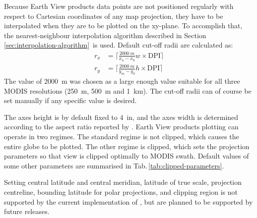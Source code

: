 Because Earth View products data points are not positioned regularly with
respect to Cartesian coordinates of any map projection, they have to be
interpolated when they are to be plotted on the xy-plane. To accomplish that,
the nearest-neighbour interpolation algorithm described in
Section\,\ref{sec:interpolation-algorithm}\, is used. Default cut-off radii are
calculated as:
\begin{align}
r_x &= \bigg\lceil \frac{\SI{2000}{m}}{x_n - x_0} w \times \mathrm{DPI}
\bigg\rceil \nonumber\\
r_y &= \bigg\lceil \frac{\SI{2000}{m}}{y_m - y_0} h \times \mathrm{DPI}
\bigg\rceil \nonumber
\end{align}
The value of \SI{2000}{m} was chosen as a large enough value suitable for all three MODIS
resolutions (\SI{250}{m}, \SI{500}{m} and \SI{1}{km}). The cut-off radii can of
course be set manually if any specific value is desired.

The axes height is by default fixed to \SI{4}{in}, and the axes width is
determined according to the aspect ratio reported by .
Earth View products plotting can operate in two regimes. The standard regime is
not clipped, which causes the entire globe to be plotted. The other regime is
clipped, which sets the projection parameters so that view is clipped
optimally to MODIS swath.  Default values of some other parameters are summarised
in Tab.\,\ref{tab:clipped-parameters}.

Setting central latitude and central meridian, latitude of true scale,
projection centreline, bounding latitude for polar projections, and clipping
region is not supported by the current implementation of \ccplot, but are planned
to be supported by future releases.


